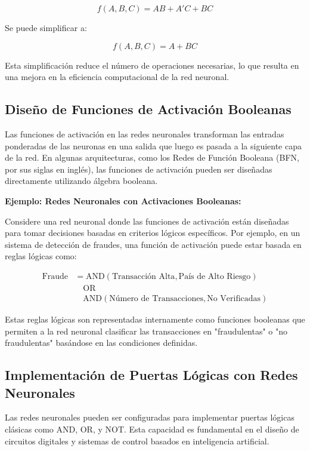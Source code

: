 \documentclass{article}
\begin{document}
\begin{multicols}{2}
\[
f(A, B, C) = AB + A'C + BC
\]

Se puede simplificar a:

\[
f(A, B, C) = A + BC
\]

Esta simplificación reduce el número de operaciones necesarias, lo que resulta en una 
mejora en la eficiencia computacional de la red neuronal.

\subsection{Diseño de Funciones de Activación Booleanas}

Las funciones de activación en las redes neuronales transforman las entradas ponderadas de 
las neuronas en una salida que luego es pasada a la siguiente capa de la red. En algunas 
arquitecturas, como los Redes de Función Booleana (BFN, por sus siglas en inglés), las 
funciones de activación pueden ser diseñadas directamente utilizando álgebra booleana.

\textbf{Ejemplo: Redes Neuronales con Activaciones Booleanas:}

Considere una red neuronal donde las funciones de activación están diseñadas para tomar 
decisiones basadas en criterios lógicos específicos. Por ejemplo, en un sistema de 
detección de fraudes, una función de activación puede estar basada en reglas lógicas como:

\begin{align*}
    \text{Fraude} &= \text{AND}(\text{Transacción Alta}, \text{País de Alto Riesgo}) \\
    &\quad \text{OR} \\
    &\quad \text{AND}(\text{Número de Transacciones}, \text{No Verificadas})
    \end{align*}
    

Estas reglas lógicas son representadas internamente como funciones booleanas que permiten a la 
red neuronal clasificar las transacciones en "fraudulentas" o "no fraudulentas" basándose en las 
condiciones definidas.

\subsection{Implementación de Puertas Lógicas con Redes Neuronales}

Las redes neuronales pueden ser configuradas para implementar puertas lógicas clásicas como 
AND, OR, y NOT. Esta capacidad es fundamental en el diseño de circuitos digitales y sistemas 
de control basados en inteligencia artificial.


\end{multicols}
\end{document}
